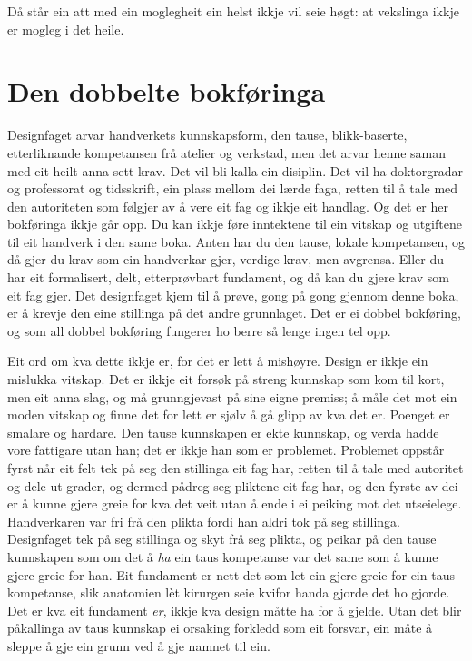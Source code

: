 Då står ein att med ein moglegheit ein helst ikkje vil seie høgt: at vekslinga ikkje er mogleg i det heile.

\section{Den dobbelte bokføringa}

Designfaget arvar handverkets kunnskapsform, den tause, blikk-baserte, etterliknande kompetansen frå atelier og verkstad, men det arvar henne saman med eit heilt anna sett krav. Det vil bli kalla ein disiplin. Det vil ha doktorgradar og professorat og tidsskrift, ein plass mellom dei lærde faga, retten til å tale med den autoriteten som følgjer av å vere eit fag og ikkje eit handlag. Og det er her bokføringa ikkje går opp. Du kan ikkje føre inntektene til ein vitskap og utgiftene til eit handverk i den same boka. Anten har du den tause, lokale kompetansen, og då gjer du krav som ein handverkar gjer, verdige krav, men avgrensa. Eller du har eit formalisert, delt, etterprøvbart fundament, og då kan du gjere krav som eit fag gjer. Det designfaget kjem til å prøve, gong på gong gjennom denne boka, er å krevje den eine stillinga på det andre grunnlaget. Det er ei dobbel bokføring, og som all dobbel bokføring fungerer ho berre så lenge ingen tel opp.

Eit ord om kva dette ikkje er, for det er lett å mishøyre. Design er ikkje ein mislukka vitskap. Det er ikkje eit forsøk på streng kunnskap som kom til kort, men eit anna slag, og må grunngjevast på sine eigne premiss; å måle det mot ein moden vitskap og finne det for lett er sjølv å gå glipp av kva det er. Poenget er smalare og hardare. Den tause kunnskapen er ekte kunnskap, og verda hadde vore fattigare utan han; det er ikkje han som er problemet. Problemet oppstår fyrst når eit felt tek på seg den stillinga eit fag har, retten til å tale med autoritet og dele ut grader, og dermed pådreg seg pliktene eit fag har, og den fyrste av dei er å kunne gjere greie for kva det veit utan å ende i ei peiking mot det utseielege. Handverkaren var fri frå den plikta fordi han aldri tok på seg stillinga. Designfaget tek på seg stillinga og skyt frå seg plikta, og peikar på den tause kunnskapen som om det å \emph{ha} ein taus kompetanse var det same som å kunne gjere greie for han. Eit fundament er nett det som let ein gjere greie for ein taus kompetanse, slik anatomien lèt kirurgen seie kvifor handa gjorde det ho gjorde. Det er kva eit fundament \emph{er}, ikkje kva design måtte ha for å gjelde. Utan det blir påkallinga av taus kunnskap ei orsaking forkledd som eit forsvar, ein måte å sleppe å gje ein grunn ved å gje namnet til ein.

